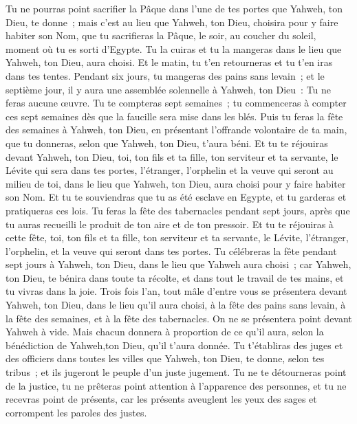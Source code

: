 \begin{multicols}{2}
Tu ne pourras point sacrifier la Pâque dans l'une de tes portes que Yahweh, ton Dieu, te donne~;
mais c'est au lieu que Yahweh, ton Dieu, choisira pour y faire habiter son Nom, que tu sacrifieras la Pâque, le soir, au coucher du soleil, moment où tu es sorti d'Egypte.
Tu la cuiras et tu la mangeras dans le lieu que Yahweh, ton Dieu, aura choisi. Et le matin, tu t'en retourneras et tu t'en iras dans tes tentes.
Pendant six jours, tu mangeras des pains sans levain~; et le septième jour, il y aura une assemblée solennelle à Yahweh, ton Dieu~: Tu ne feras aucune œuvre.
Tu te compteras sept semaines~; tu commenceras à compter ces sept semaines dès que la faucille sera mise dans les blés.
Puis tu feras la fête des semaines à Yahweh, ton Dieu, en présentant l'offrande volontaire de ta main, que tu donneras, selon que Yahweh, ton Dieu, t'aura béni.
Et tu te réjouiras devant Yahweh, ton Dieu, toi, ton fils et ta fille, ton serviteur et ta servante, le Lévite qui sera dans tes portes, l'étranger, l'orphelin et la veuve qui seront au milieu de toi, dans le lieu que Yahweh, ton Dieu, aura choisi pour y faire habiter son Nom.
Et tu te souviendras que tu as été esclave en Egypte, et tu garderas et pratiqueras ces lois.
Tu feras la fête des tabernacles pendant sept jours, après que tu auras recueilli le produit de ton aire et de ton pressoir.
Et tu te réjouiras à cette fête, toi, ton fils et ta fille, ton serviteur et ta servante, le Lévite, l'étranger, l'orphelin, et la veuve qui seront dans tes portes.
Tu célébreras la fête pendant sept jours à Yahweh, ton Dieu, dans le lieu que Yahweh aura choisi~; car Yahweh, ton Dieu, te bénira dans toute ta récolte, et dans tout le travail de tes mains, et tu vivras dans la joie.
Trois fois l'an, tout mâle d'entre vous se présentera devant Yahweh, ton Dieu, dans le lieu qu'il aura choisi, à la fête des pains sans levain, à la fête des semaines, et à la fête des tabernacles. On ne se présentera point devant Yahweh à vide.
Mais chacun donnera à proportion de ce qu'il aura, selon la bénédiction de Yahweh,ton Dieu, qu'il t'aura donnée. 
Tu t'établiras des juges et des officiers dans toutes les villes que Yahweh, ton Dieu, te donne, selon tes tribus~; et ils jugeront le peuple d'un juste jugement.
Tu ne te détourneras point de la justice, tu ne prêteras point attention à l'apparence des personnes, et tu ne recevras point de présents, car les présents aveuglent les yeux des sages et corrompent les paroles des justes.

\end{multicols}
